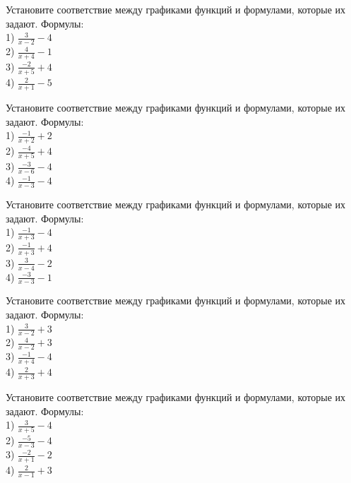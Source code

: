 \documentclass[4apaper]{article}
\begin{document}
\begin{taskBN}{66}
Установите соответствие между графиками функций и формулами, которые их задают. Формулы: \\1) $\frac{3}{x-2}-4$\\2) $\frac{4}{x+4}-1$\\3) $\frac{-2}{x+5}+4$\\4) $\frac{2}{x+1}-5$
\end{taskBN}

\begin{taskBN}{67}
Установите соответствие между графиками функций и формулами, которые их задают. Формулы: \\1) $\frac{-1}{x+2}+2$\\2) $\frac{-4}{x+5}+4$\\3) $\frac{-3}{x-6}-4$\\4) $\frac{-1}{x-3}-4$
\end{taskBN}

\begin{taskBN}{68}
Установите соответствие между графиками функций и формулами, которые их задают. Формулы: \\1) $\frac{-1}{x+3}-4$\\2) $\frac{-1}{x+3}+4$\\3) $\frac{3}{x-4}-2$\\4) $\frac{-3}{x-3}-1$
\end{taskBN}

\begin{taskBN}{69}
Установите соответствие между графиками функций и формулами, которые их задают. Формулы: \\1) $\frac{3}{x-2}+3$\\2) $\frac{4}{x-2}+3$\\3) $\frac{-1}{x+4}-4$\\4) $\frac{2}{x+3}+4$
\end{taskBN}

\begin{taskBN}{70}
Установите соответствие между графиками функций и формулами, которые их задают. Формулы: \\1) $\frac{3}{x+5}-4$\\2) $\frac{-5}{x-3}-4$\\3) $\frac{-2}{x+1}-2$\\4) $\frac{2}{x-1}+3$
\end{taskBN}
\end{document}
